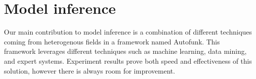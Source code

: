 \section{Model inference}
\label{sec:conclusion:modelinf}

Our main contribution to model inference is a combination of
different techniques coming from heterogenous fields in a
framework named Autofunk. This framework leverages different
techniques such as machine learning, data mining, and expert
systems. Experiment results prove both speed and effectiveness of
this solution, however there is always room for improvement.

